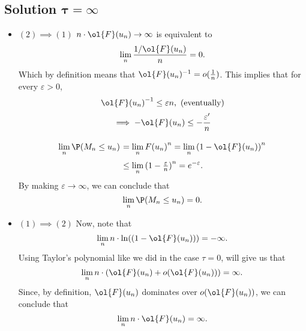 \subsection*{Solution $\boldsymbol{\tau = \infty}$}

\begin{itemize}
    \item $(2)\implies (1)$ $n\cdot \ol{F}(u_n) \to \infty$ is equivalent to
    \[ \lim_n \frac{1/\ol{F}(u_n)}{n} = 0. \]
    Which by definition means that $ \ol{F}(u_n)^{-1} = o(\tfrac{1}{n}) $. This implies that for every $\varepsilon>0$,
    \[ {\ol{F}(u_n)}^{-1} \leq \varepsilon n, \text{ (eventually)} \]
    \[ \implies -\ol{F}(u_n) \leq -\frac{\varepsilon'}{n} \]
    \[ \everymath{\displaystyle}
    \arraycolsep=1.8pt\def\arraystretch{1.8}
    \begin{array}{rll}
        \lim_n \P(M_n \leq u_n) & = \lim_n {F(u_n)}^n = \lim_n {(1-\ol{F}(u_n))}^n\\
        & \leq \lim_n {(1-\tfrac{\varepsilon}{n})}^n = e^{-\varepsilon}.
    \end{array} \]
    By making $\varepsilon \to \infty$, we can conclude that
    \[ \lim_n \P(M_n \leq u_n) = 0. \]
    \item $(1)\implies (2)$ Now, note that
    \[ \lim_n n\cdot \ln((1-\ol{F}(u_{n}))) = -\infty.\]
    Using Taylor's polynomial like we did in the case $\tau = 0$, will give us that
    \[ \lim_n n\cdot (\ol{F}(u_{n}) + o(\ol{F}(u_{n}))) = \infty.  \]
    Since, by definition, $\ol{F}(u_{n})$ dominates over $o(\ol{F}(u_{n}))$, we can conclude that
    \[  \lim_n n\cdot \ol{F}(u_{n}) = \infty.\]
\end{itemize}